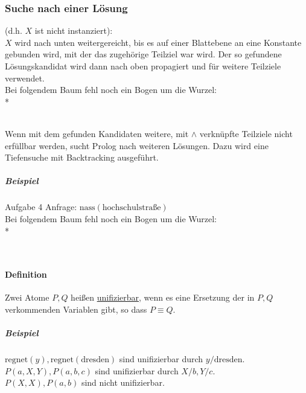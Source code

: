 \documentclass[a4paper]{scrartcl}
\begin{document}
\subsubsection{Suche nach einer Lösung} (d.h. $X$ ist nicht instanziert):\\
$X$ wird nach unten weitergereicht, bis es auf einer Blattebene an eine Konstante gebunden wird, mit der das zugehörige Teilziel war wird. Der so gefundene Lösungskandidat wird dann nach oben propagiert und für weitere Teilziele verwendet.\\
Bei folgendem Baum fehl noch ein Bogen um die Wurzel:\\*
\\
Wenn mit dem gefunden Kandidaten weitere, mit $\wedge$ verknüpfte Teilziele nicht erfüllbar werden, sucht Prolog nach weiteren Lösungen. Dazu wird eine Tiefensuche mit Backtracking ausgeführt.

\subparagraph{Beispiel} Aufgabe 4
Anfrage: $\text{nass}(\text{hochschulstraße})$\\
Bei folgendem Baum fehl noch ein Bogen um die Wurzel:\\*
\\

\paragraph{Definition}
Zwei Atome $P,Q$ heißen \underline{unifizierbar}, wenn es eine Ersetzung der in $P,Q$ verkommenden Variablen gibt, so dass $P \equiv Q$.

\subparagraph{Beispiel} $\text{regnet}(y),\text{regnet}(\text{dresden})$ sind unifizierbar durch $y / \text{dresden}.$\\ $P(a,X,Y),P(a,b,c)$ sind unifizierbar durch $X/b,Y/c.$\\ $P(X,X),P(a,b)$ sind nicht unifizierbar.
\end{document}
